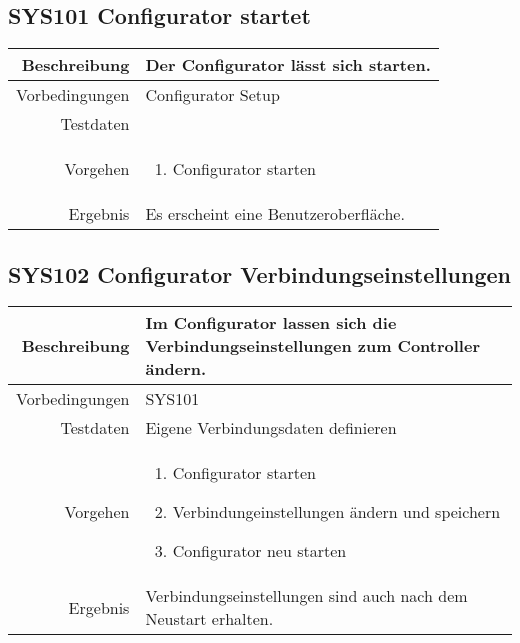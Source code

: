 \subsection{SYS101 Configurator startet}
\begin{table}[h!]
	\renewcommand{\arraystretch}{1.5}
	\begin{tabular}{|r|p{14cm}|}
		\hline Beschreibung & Der Configurator lässt sich starten. \\ 
		\hline Vorbedingungen & Configurator Setup \\ 
		\hline Testdaten &  \\ 
		\hline Vorgehen & 
		\begin{enumerate}
			\item Configurator starten
		\end{enumerate} \\ 
		\hline Ergebnis & Es erscheint eine Benutzeroberfläche. \\ 
		\hline 
	\end{tabular}
\end{table}

\subsection{SYS102 Configurator Verbindungseinstellungen }
\begin{table}[h!]
	\renewcommand{\arraystretch}{1.5}
	\begin{tabular}{|r|p{14cm}|}
		\hline Beschreibung & Im Configurator lassen sich die Verbindungseinstellungen zum Controller ändern. \\ 
		\hline Vorbedingungen & SYS101 \\ 
		\hline Testdaten & Eigene Verbindungsdaten definieren \\ 
		\hline Vorgehen & 
		\begin{enumerate}
			\item Configurator starten
			\item Verbindungeinstellungen ändern und speichern
			\item Configurator neu starten
		\end{enumerate} \\ 
		\hline Ergebnis & Verbindungseinstellungen sind auch nach dem Neustart erhalten. \\ 
		\hline 
	\end{tabular}
\end{table}

